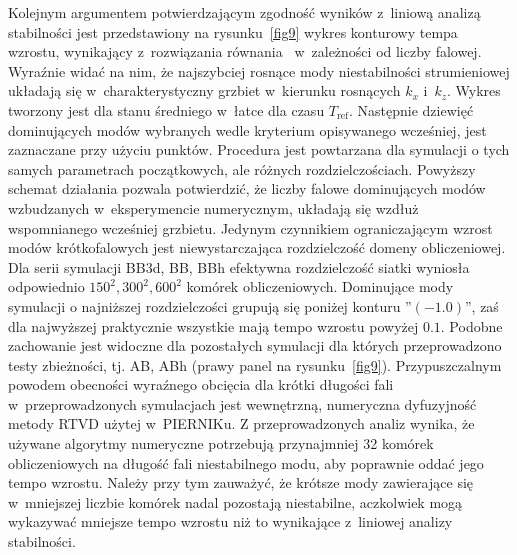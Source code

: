\par Kolejnym argumentem potwierdzającym zgodność wyników z~liniową analizą
stabilności jest przedstawiony na rysunku~\ref{fig9} wykres konturowy tempa
wzrostu, wynikający z~rozwiązania równania~ w~zależności od
liczby falowej. Wyraźnie widać na nim, że najszybciej rosnące mody
niestabilności strumieniowej układają się w~charakterystyczny grzbiet w~kierunku
rosnących $k_x$ i~$k_z$.  Wykres tworzony jest dla stanu średniego w~łatce dla
czasu $T_{\textrm{ref}}$.  Następnie dziewięć dominujących modów wybranych wedle
kryterium opisywanego wcześniej, jest zaznaczane przy użyciu punktów. Procedura
jest powtarzana dla symulacji o tych samych parametrach początkowych, ale
różnych rozdzielczościach.  Powyższy schemat działania pozwala potwierdzić, że
liczby falowe dominujących modów wzbudzanych w~eksperymencie numerycznym,
układają się wzdłuż wspomnianego wcześniej grzbietu. Jedynym czynnikiem
ograniczającym wzrost modów krótkofalowych jest niewystarczająca rozdzielczość
domeny obliczeniowej. Dla serii symulacji BB3d, BB, BBh efektywna rozdzielczość
siatki wyniosła odpowiednio $150^2, 300^2, 600^2$ komórek obliczeniowych.
Dominujące mody symulacji o najniższej rozdzielczości grupują się poniżej
konturu ''$(-1.0)$'', zaś dla najwyższej praktycznie wszystkie mają tempo
wzrostu powyżej $0.1$. Podobne zachowanie jest widoczne dla pozostałych
symulacji dla których przeprowadzono testy zbieżności, tj. AB, ABh (prawy panel
na rysunku~\ref{fig9}). Przypuszczalnym powodem obecności wyraźnego obcięcia dla
krótki długości fali w~przeprowadzonych symulacjach jest wewnętrzną, numeryczna
dyfuzyjność metody RTVD użytej w~PIERNIKu. Z przeprowadzonych analiz wynika, że
używane algorytmy numeryczne potrzebują przynajmniej 32 komórek obliczeniowych
na długość fali niestabilnego modu, aby poprawnie oddać jego tempo wzrostu.
Należy przy tym zauważyć, że krótsze mody zawierające się w~mniejszej liczbie
komórek nadal pozostają niestabilne, aczkolwiek mogą wykazywać mniejsze tempo
wzrostu niż to wynikające z~liniowej analizy stabilności.
%
